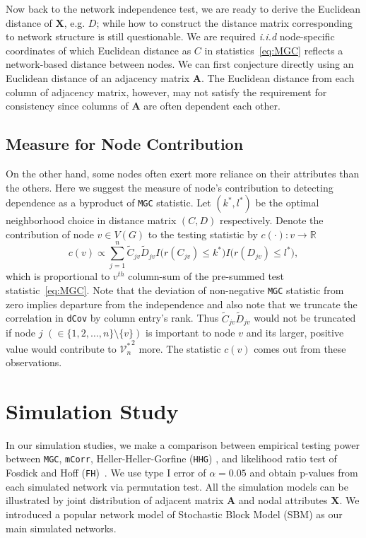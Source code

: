 \documentclass[11pt]{article}
\theoremstyle{definition}
\begin{document}
Now back to the network independence test, we are ready to derive the Euclidean distance of $\mathbf{X}$, e.g. $D$; while how to construct the distance matrix corresponding to network structure is still questionable. We are required \textit{i.i.d} node-specific coordinates of which Euclidean distance as $C$ in statistics~\ref{eq:MGC} reflects a network-based distance between nodes. We can first conjecture directly using an Euclidean distance of an adjacency matrix $\mathbf{A}$. The Euclidean distance from each column of adjacency matrix, however, may not satisfy the requirement for consistency since columns of $\mathbf{A}$ are often dependent each other.

\subsection{Measure for Node Contribution}
On the other hand, some nodes often exert more reliance on their attributes than the others. Here we suggest the measure of node's contribution to detecting dependence as a byproduct of \texttt{MGC} statistic. Let $(k^{*}, l^{*})$ be the optimal neighborhood choice in distance matrix $(C, D)$ respectively. Denote the contribution of node $v \in V(G)$ to the testing statistic by  $c(\cdot) : v \rightarrow \mathbb{R}$
\begin{equation}
\label{eq:contribution}
c(v) \propto \sum\limits_{j=1}^{n} \tilde{C}_{j v} \tilde{D}_{j v} I \big(  r (C_{j v}) \leq k^{*}  \big) I \big( r (D_{ j v }) \leq l^{*} \big), 
\end{equation}
which is proportional to $v^{th}$ column-sum of the pre-summed test statistic~\ref{eq:MGC}. Note that the deviation of non-negative \texttt{MGC} statistic from zero implies departure from the independence and also note that we truncate the correlation in \texttt{dCov} by column entry's rank. Thus $\tilde{C}_{jv} \tilde{D}_{jv}$ would not be truncated if node $j$ $(\in \{ 1,2, \ldots, n \} \setminus \{v \} )$ is important to node $v$ and its larger, positive value would contribute to ${\mathcal{V}^{*}_{n}}^2$ more. The statistic $c(v)$ comes out from these observations. 

\section{Simulation Study}
\label{sec:simulation}
	\vspace*{-0.2cm}
In our simulation studies, we make a comparison between empirical testing power between \texttt{MGC}, \texttt{mCorr}, Heller-Heller-Gorfine (\texttt{HHG}) \citep{heller2012consistent}, and likelihood ratio test of Fosdick and Hoff (\texttt{FH})~\citep{fosdick2015testing}. We use type I error of $\alpha = 0.05$ and obtain p-values from each simulated network via permutation test. All the simulation models can be illustrated by joint distribution of adjacent matrix $\mathbf{A}$ and nodal attributes $\mathbf{X}$. We introduced a popular network model of Stochastic Block Model (SBM) as our main simulated networks. 
\end{document}
